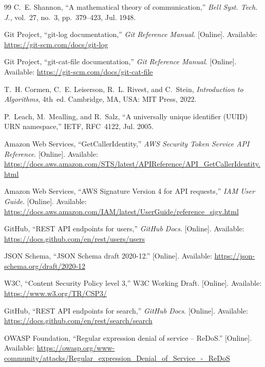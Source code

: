 \documentclass[conference]{IEEEtran}
\begin{document}
\begin{thebibliography}{99}
C.~E. Shannon, ``A mathematical theory of communication,'' \emph{Bell Syst. Tech. J.}, vol.~27,
no.~3, pp.~379--423, Jul. 1948.

Git Project, ``git-log documentation,'' \emph{Git Reference Manual}. [Online]. Available:
\url{https://git-scm.com/docs/git-log}

Git Project, ``git-cat-file documentation,'' \emph{Git Reference Manual}. [Online]. Available:
\url{https://git-scm.com/docs/git-cat-file}

T.~H. Cormen, C.~E. Leiserson, R.~L. Rivest, and C.~Stein, \emph{Introduction to Algorithms},
4th~ed. Cambridge, MA, USA: MIT Press, 2022.

P.~Leach, M.~Mealling, and R.~Salz, ``A universally unique identifier ({UUID}) {URN} namespace,''
IETF, RFC~4122, Jul. 2005.

Amazon Web Services, ``GetCallerIdentity,'' \emph{AWS Security Token Service API Reference}.
[Online]. Available:
\url{https://docs.aws.amazon.com/STS/latest/APIReference/API_GetCallerIdentity.html}

Amazon Web Services, ``AWS Signature Version 4 for API requests,'' \emph{IAM User Guide}.
[Online]. Available: \url{https://docs.aws.amazon.com/IAM/latest/UserGuide/reference_sigv.html}

GitHub, ``REST API endpoints for users,'' \emph{GitHub Docs}. [Online]. Available:
\url{https://docs.github.com/en/rest/users/users}

JSON Schema, ``JSON Schema draft 2020-12.'' [Online]. Available:
\url{https://json-schema.org/draft/2020-12}

W3C, ``Content Security Policy level 3,'' W3C Working Draft. [Online]. Available:
\url{https://www.w3.org/TR/CSP3/}

GitHub, ``REST API endpoints for search,'' \emph{GitHub Docs}. [Online]. Available:
\url{https://docs.github.com/en/rest/search/search}

OWASP Foundation, ``Regular expression denial of service -- ReDoS.'' [Online]. Available:
\url{https://owasp.org/www-community/attacks/Regular_expression_Denial_of_Service_-_ReDoS}

\end{thebibliography}
\end{document}
